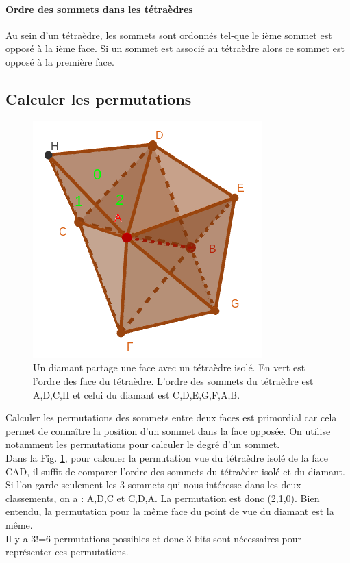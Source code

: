 \paragraph{Ordre des sommets dans les tétraèdres}
Au sein d'un tétraèdre, les sommets sont ordonnés tel-que le ième sommet est opposé à la ième face. Si un sommet est associé au tétraèdre alors ce sommet est opposé à la première face.
\subsection{Calculer les permutations}
\begin{figure}[th]
\begin{center}
\includegraphics[scale=0.45]{Images/permutation_tetra_diamant}
\caption{Un diamant partage une face avec un tétraèdre isolé. En vert est l'ordre des face du tétraèdre. L'ordre des sommets du tétraèdre est A,D,C,H et celui du diamant est C,D,E,G,F,A,B.}
\label{fig:permutation_tetra_diamant}
\end{center}
\end{figure}
\noindent
Calculer les permutations des sommets entre deux faces est primordial car cela permet de connaître la position d'un sommet dans la face opposée. On utilise notamment les permutations pour calculer le degré d'un sommet.\\
Dans la Fig. \ref{fig:permutation_tetra_diamant}, pour calculer la permutation vue du tétraèdre isolé de la face CAD, il suffit de comparer l'ordre des sommets du tétraèdre isolé et du diamant. Si l'on garde seulement les 3 sommets qui nous intéresse dans les deux classements, on a : A,D,C et C,D,A. La permutation est donc (2,1,0). Bien entendu, la permutation pour la même face du point de vue du diamant est la même.\\
Il y a 3!=6 permutations possibles et donc 3 bits sont nécessaires pour représenter ces permutations.
